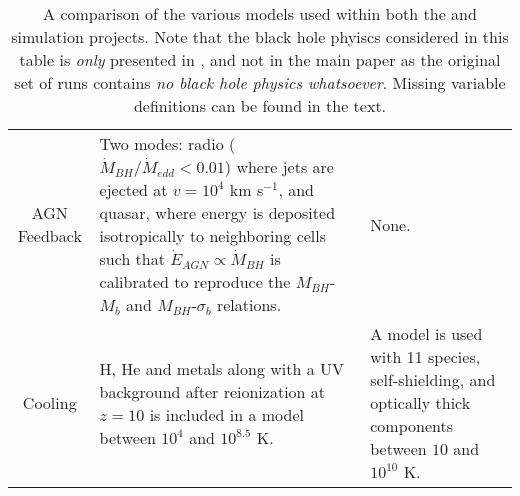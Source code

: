 \begin{table*}
\begin{tabularx}{\textwidth}{cXX}
    AGN Feedback & Two modes: radio ($\dot{M}_{BH}/\dot{M}_{edd} < 0.01$) where jets are ejected at $v = 10^{4}$ km s$^{-1}$, and quasar, where energy is deposited isotropically to neighboring cells such that $\dot{E}_{AGN} \propto \dot{M}_{BH}$ is calibrated to reproduce the $M_{BH}$-$M_b$ and $M_{BH}$-$\sigma_b$ relations. & None. \\
    Cooling & H, He and metals along with a UV background after reionization at $z=10$ is included in a \citet{sutherland_cooling_1993} model between $10^4$ and $10^{8.5}$ K. & A \citet{hopkins_galaxies_2014} model is used with 11 species, self-shielding, and optically thick components between $10$ and $10^{10}$ K. 
  \end{tabularx}
  \caption{A comparison of the various models used within both the \hagn{} and
    \fire{} simulation projects. Note that the black hole phyiscs considered in
    this table is \emph{only} presented in \citet{angles-alcazar_black_2017},
    and not in the main \fire{} paper \citep{hopkins_fire-2_2017} as the
    original set of \fire{} runs contains \emph{no black hole physics
    whatsoever}. Missing variable definitions can be found in the text.}
  \label{tab:comparison}
\end{table*}
\restoregeometry

